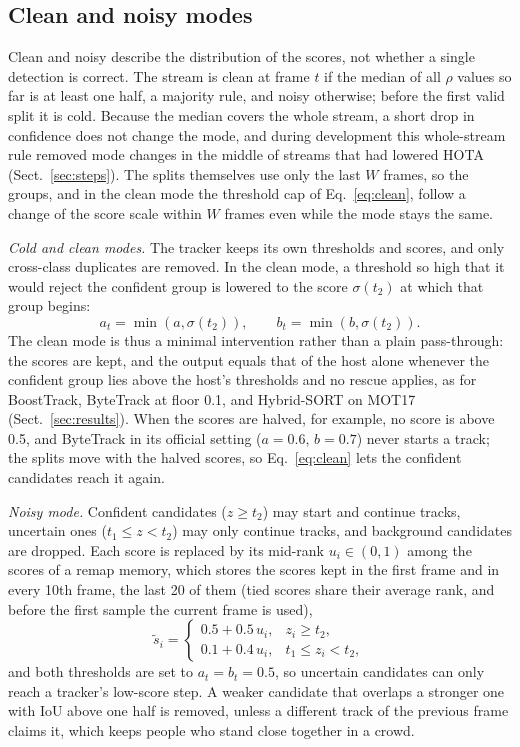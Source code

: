 \subsection{Clean and noisy modes}\label{sec:regimes}
Clean and noisy describe the distribution of the scores, not whether a single detection is
correct. The stream is clean at frame $t$ if the median of all $\rho$ values so far is at least one half,
a majority rule, and noisy otherwise; before the first valid split it is cold. Because the median
covers the whole stream, a short drop in confidence does not change the mode, and during
development this whole-stream rule removed mode changes in the middle of streams that had lowered
HOTA (Sect.~\ref{sec:steps}). The splits themselves use only the last $W$ frames, so the groups, and
in the clean mode the threshold cap of Eq.~\eqref{eq:clean}, follow a change of the score scale
within $W$ frames even while the mode stays the same.

\emph{Cold and clean modes.} The tracker keeps its own thresholds and scores, and only cross-class
duplicates are removed. In the clean mode, a threshold so high that it would reject the confident
group is lowered to the score $\sigma(t_2)$ at which that group begins:
\begin{equation}
a_t=\min\!\left(a,\sigma(t_2)\right),\qquad b_t=\min\!\left(b,\sigma(t_2)\right).
\label{eq:clean}
\end{equation}
The clean mode is thus a minimal intervention rather than a plain pass-through: the scores are
kept, and the output equals that of the host alone whenever the confident group lies above the
host's thresholds and no rescue applies, as for BoostTrack, ByteTrack at floor 0.1, and Hybrid-SORT
on MOT17 (Sect.~\ref{sec:results}). When the scores are halved, for example, no score is above 0.5, and ByteTrack in
its official setting ($a=0.6$, $b=0.7$) never starts a track; the splits move with the halved
scores, so Eq.~\eqref{eq:clean} lets the confident candidates reach it again.

\emph{Noisy mode.} Confident candidates ($z\ge t_2$) may start and continue tracks, uncertain ones
($t_1\le z<t_2$) may only continue tracks, and background candidates are dropped. Each score is
replaced by its mid-rank $u_i\in(0,1)$ among the scores of a remap memory, which stores the scores
kept in the first frame and in every 10th frame, the last 20 of them (tied scores share their average
rank, and before the first sample the current frame is used),
\begin{equation}
\tilde{s}_i=
\begin{cases}
0.5+0.5\,u_i, & z_i\ge t_2,\\
0.1+0.4\,u_i, & t_1\le z_i<t_2,
\end{cases}
\label{eq:remap}
\end{equation}
and both thresholds are set to $a_t=b_t=0.5$, so uncertain candidates can only reach a tracker's
low-score step. A weaker candidate that overlaps a stronger one with IoU above one half is removed,
unless a different track of the previous frame claims it, which keeps people who stand close
together in a crowd.


